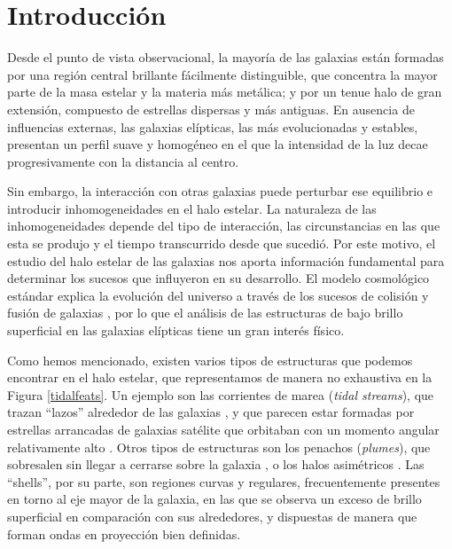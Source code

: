 \section{Introducción}
Desde el punto de vista observacional, la mayoría de las galaxias están formadas por una región central brillante fácilmente distinguible, que concentra la mayor parte de la masa estelar y la materia más metálica; y por un tenue halo de gran extensión, compuesto de estrellas dispersas y más antiguas. En ausencia de influencias externas, las galaxias elípticas, las más evolucionadas y estables, presentan un perfil suave y homogéneo en el que la intensidad de la luz decae progresivamente con la distancia al centro. \par

Sin embargo, la interacción con otras galaxias puede perturbar ese equilibrio e introducir inhomogeneidades en el halo estelar. La naturaleza de las inhomogeneidades depende del tipo de interacción, las circunstancias en las que esta se produjo y el tiempo transcurrido desde que sucedió. Por este motivo, el estudio del halo estelar de las galaxias nos aporta información fundamental para determinar los sucesos que influyeron en su desarrollo. El modelo cosmológico estándar explica la evolución del universo a través de los sucesos de colisión y fusión de galaxias \citep{bullockTracingGalaxyFormation2005,popFormationIncidenceShell2018}, por lo que el análisis de las estructuras de bajo brillo superficial en las galaxias elípticas tiene un gran interés físico. \par

Como hemos mencionado, existen varios tipos de estructuras que podemos encontrar en el halo estelar, que representamos de manera no exhaustiva en la Figura \ref{tidalfeats}. Un ejemplo son las corrientes de marea (\textit{tidal streams}), que trazan \enquote{lazos} alrededor de las galaxias \citep{newbergIntroductionTidalStreams2016,martinez-delgadoDISCOVERYGIANTStelLAR2009}, y que parecen estar formadas por estrellas arrancadas de galaxias satélite que orbitaban con un momento angular relativamente alto \citep{popFormationIncidenceShell2018}. Otros tipos de estructuras son los penachos (\textit{plumes}), que sobresalen sin llegar a cerrarse sobre la galaxia \citep{martinez-delgadoStelLARTIDALSTREAMS2010}, o los halos asimétricos \citep{sakowskaStellarStreamsDwarf2026}. Las \enquote{shells}, por su parte, son regiones curvas y regulares, frecuentemente presentes en torno al eje mayor de la galaxia, en las que se observa un exceso de brillo superficial en comparación con sus alrededores, y dispuestas de manera que forman ondas en proyección bien definidas.\par \label{estructuras}

